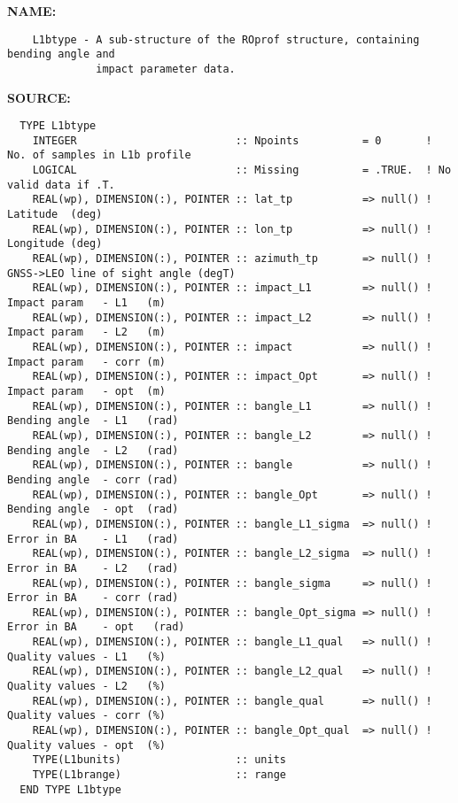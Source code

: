 \label{ch:robo35}
\label{ch:Datatypes_L1bType}
\textbf{NAME:}\hspace{0.08in}\begin{Verbatim}
    L1btype - A sub-structure of the ROprof structure, containing bending angle and
              impact parameter data.
\end{Verbatim}
\textbf{SOURCE:}\hspace{0.08in}\begin{Verbatim}
  TYPE L1btype
    INTEGER                         :: Npoints          = 0       ! No. of samples in L1b profile
    LOGICAL                         :: Missing          = .TRUE.  ! No valid data if .T.
    REAL(wp), DIMENSION(:), POINTER :: lat_tp           => null() ! Latitude  (deg)
    REAL(wp), DIMENSION(:), POINTER :: lon_tp           => null() ! Longitude (deg)
    REAL(wp), DIMENSION(:), POINTER :: azimuth_tp       => null() ! GNSS->LEO line of sight angle (degT)
    REAL(wp), DIMENSION(:), POINTER :: impact_L1        => null() ! Impact param   - L1   (m)
    REAL(wp), DIMENSION(:), POINTER :: impact_L2        => null() ! Impact param   - L2   (m)
    REAL(wp), DIMENSION(:), POINTER :: impact           => null() ! Impact param   - corr (m)
    REAL(wp), DIMENSION(:), POINTER :: impact_Opt       => null() ! Impact param   - opt  (m)
    REAL(wp), DIMENSION(:), POINTER :: bangle_L1        => null() ! Bending angle  - L1   (rad)
    REAL(wp), DIMENSION(:), POINTER :: bangle_L2        => null() ! Bending angle  - L2   (rad)
    REAL(wp), DIMENSION(:), POINTER :: bangle           => null() ! Bending angle  - corr (rad)
    REAL(wp), DIMENSION(:), POINTER :: bangle_Opt       => null() ! Bending angle  - opt  (rad)
    REAL(wp), DIMENSION(:), POINTER :: bangle_L1_sigma  => null() ! Error in BA    - L1   (rad)
    REAL(wp), DIMENSION(:), POINTER :: bangle_L2_sigma  => null() ! Error in BA    - L2   (rad)
    REAL(wp), DIMENSION(:), POINTER :: bangle_sigma     => null() ! Error in BA    - corr (rad)
    REAL(wp), DIMENSION(:), POINTER :: bangle_Opt_sigma => null() ! Error in BA    - opt   (rad)
    REAL(wp), DIMENSION(:), POINTER :: bangle_L1_qual   => null() ! Quality values - L1   (%)
    REAL(wp), DIMENSION(:), POINTER :: bangle_L2_qual   => null() ! Quality values - L2   (%)
    REAL(wp), DIMENSION(:), POINTER :: bangle_qual      => null() ! Quality values - corr (%)
    REAL(wp), DIMENSION(:), POINTER :: bangle_Opt_qual  => null() ! Quality values - opt  (%)
    TYPE(L1bunits)                  :: units
    TYPE(L1brange)                  :: range
  END TYPE L1btype
\end{Verbatim}
